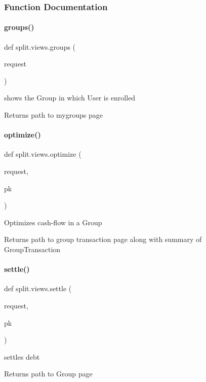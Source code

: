 \subsubsection{Function Documentation}
\mbox{\label{namespacesplit_1_1views_a419d7fc72bf890d32aba4fc21c7568d6}} 
\paragraph{\texorpdfstring{groups()}{groups()}}
{\footnotesize\ttfamily def split.\+views.\+groups (\begin{DoxyParamCaption}\item[{}]{request }\end{DoxyParamCaption})}



shows the Group in which User is enrolled 

\begin{DoxyReturn}{Returns}
path to mygroups page 
\end{DoxyReturn}
\mbox{\label{namespacesplit_1_1views_af11b16cc5761572469c76c3bcb219bc9}} 
\paragraph{\texorpdfstring{optimize()}{optimize()}}
{\footnotesize\ttfamily def split.\+views.\+optimize (\begin{DoxyParamCaption}\item[{}]{request,  }\item[{}]{pk }\end{DoxyParamCaption})}



Optimizes cash-\/flow in a Group 

\begin{DoxyReturn}{Returns}
path to group transaction page along with summary of Group\+Transaction 
\end{DoxyReturn}
\mbox{\label{namespacesplit_1_1views_aabff0365b58e8c915cec74ee02a2ae12}} 
\paragraph{\texorpdfstring{settle()}{settle()}}
{\footnotesize\ttfamily def split.\+views.\+settle (\begin{DoxyParamCaption}\item[{}]{request,  }\item[{}]{pk }\end{DoxyParamCaption})}



settles debt 

\begin{DoxyReturn}{Returns}
path to Group page 
\end{DoxyReturn}
